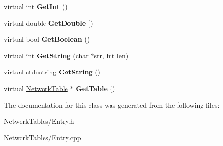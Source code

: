 \begin{DoxyCompactItemize}
\item 
\hypertarget{classNetworkTables_1_1Entry_a949960330c2e53532736ee347801f45d}{
virtual int {\bfseries GetInt} ()}
\label{classNetworkTables_1_1Entry_a949960330c2e53532736ee347801f45d}

\item 
\hypertarget{classNetworkTables_1_1Entry_a50ad2e12e2cd1554a8067637bd89bcf0}{
virtual double {\bfseries GetDouble} ()}
\label{classNetworkTables_1_1Entry_a50ad2e12e2cd1554a8067637bd89bcf0}

\item 
\hypertarget{classNetworkTables_1_1Entry_aff177322b18b17c75a24316ad6f231df}{
virtual bool {\bfseries GetBoolean} ()}
\label{classNetworkTables_1_1Entry_aff177322b18b17c75a24316ad6f231df}

\item 
\hypertarget{classNetworkTables_1_1Entry_a3900eddcc2560e24f3f36e04bba8a6fd}{
virtual int {\bfseries GetString} (char $\ast$str, int len)}
\label{classNetworkTables_1_1Entry_a3900eddcc2560e24f3f36e04bba8a6fd}

\item 
\hypertarget{classNetworkTables_1_1Entry_ac1e8728df2cb0f7bb9167328da6c38df}{
virtual std::string {\bfseries GetString} ()}
\label{classNetworkTables_1_1Entry_ac1e8728df2cb0f7bb9167328da6c38df}

\item 
\hypertarget{classNetworkTables_1_1Entry_a192c98a0781ddabba946f8a0e60d33d1}{
virtual \hyperlink{classNetworkTable}{NetworkTable} $\ast$ {\bfseries GetTable} ()}
\label{classNetworkTables_1_1Entry_a192c98a0781ddabba946f8a0e60d33d1}

\end{DoxyCompactItemize}


The documentation for this class was generated from the following files:\begin{DoxyCompactItemize}
\item 
NetworkTables/Entry.h\item 
NetworkTables/Entry.cpp\end{DoxyCompactItemize}
